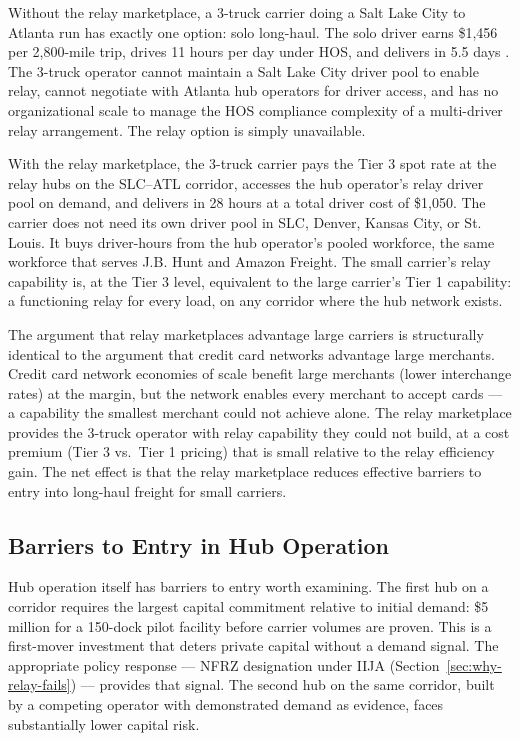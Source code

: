 Without the relay marketplace, a 3-truck carrier doing a Salt Lake City to Atlanta run has exactly one option: solo long-haul. The solo driver earns \$1,456 per 2,800-mile trip, drives 11 hours per day under HOS, and delivers in 5.5 days \citep{FMCSA_HOS2022}. The 3-truck operator cannot maintain a Salt Lake City driver pool to enable relay, cannot negotiate with Atlanta hub operators for driver access, and has no organizational scale to manage the HOS compliance complexity of a multi-driver relay arrangement. The relay option is simply unavailable.

With the relay marketplace, the 3-truck carrier pays the Tier 3 spot rate at the relay hubs on the SLC--ATL corridor, accesses the hub operator's relay driver pool on demand, and delivers in 28 hours at a total driver cost of \$1,050. The carrier does not need its own driver pool in SLC, Denver, Kansas City, or St. Louis. It buys driver-hours from the hub operator's pooled workforce, the same workforce that serves J.B. Hunt and Amazon Freight. The small carrier's relay capability is, at the Tier 3 level, equivalent to the large carrier's Tier 1 capability: a functioning relay for every load, on any corridor where the hub network exists.

The argument that relay marketplaces advantage large carriers is structurally identical to the argument that credit card networks advantage large merchants. Credit card network economies of scale benefit large merchants (lower interchange rates) at the margin, but the network enables every merchant to accept cards --- a capability the smallest merchant could not achieve alone. The relay marketplace provides the 3-truck operator with relay capability they could not build, at a cost premium (Tier 3 vs.\ Tier 1 pricing) that is small relative to the relay efficiency gain. The net effect is that the relay marketplace reduces effective barriers to entry into long-haul freight for small carriers.

\subsection{Barriers to Entry in Hub Operation}

Hub operation itself has barriers to entry worth examining. The first hub on a corridor requires the largest capital commitment relative to initial demand: \$5 million for a 150-dock pilot facility before carrier volumes are proven. This is a first-mover investment that deters private capital without a demand signal. The appropriate policy response --- NFRZ designation under IIJA (Section~\ref{sec:why-relay-fails}) --- provides that signal. The second hub on the same corridor, built by a competing operator with demonstrated demand as evidence, faces substantially lower capital risk.

